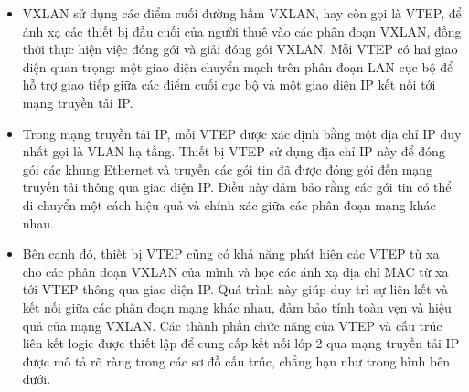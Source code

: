 \documentclass[13pt]{article}
\begin{document}
\begin{enumerate}
    \begin{itemize}
        \item VXLAN sử dụng các điểm cuối đường hầm VXLAN, hay còn gọi là VTEP, để ánh xạ các thiết bị đầu cuối của người thuê vào các phân đoạn VXLAN, đồng thời thực hiện việc đóng gói và giải đóng gói VXLAN. Mỗi VTEP có hai giao diện quan trọng: một giao diện chuyển mạch trên phân đoạn LAN cục bộ để hỗ trợ giao tiếp giữa các điểm cuối cục bộ và một giao diện IP kết nối tới mạng truyền tải IP.
        \item Trong mạng truyền tải IP, mỗi VTEP được xác định bằng một địa chỉ IP duy nhất gọi là VLAN hạ tầng. Thiết bị VTEP sử dụng địa chỉ IP này để đóng gói các khung Ethernet và truyền các gói tin đã được đóng gói đến mạng truyền tải thông qua giao diện IP. Điều này đảm bảo rằng các gói tin có thể di chuyển một cách hiệu quả và chính xác giữa các phân đoạn mạng khác nhau.
        \item Bên cạnh đó, thiết bị VTEP cũng có khả năng phát hiện các VTEP từ xa cho các phân đoạn VXLAN của mình và học các ánh xạ địa chỉ MAC từ xa tới VTEP thông qua giao diện IP. Quá trình này giúp duy trì sự liên kết và kết nối giữa các phân đoạn mạng khác nhau, đảm bảo tính toàn vẹn và hiệu quả của mạng VXLAN. Các thành phần chức năng của VTEP và cấu trúc liên kết logic được thiết lập để cung cấp kết nối lớp 2 qua mạng truyền tải IP được mô tả rõ ràng trong các sơ đồ cấu trúc, chẳng hạn như trong hình bên dưới.
    \end{itemize}
\end{enumerate}
\end{document}
